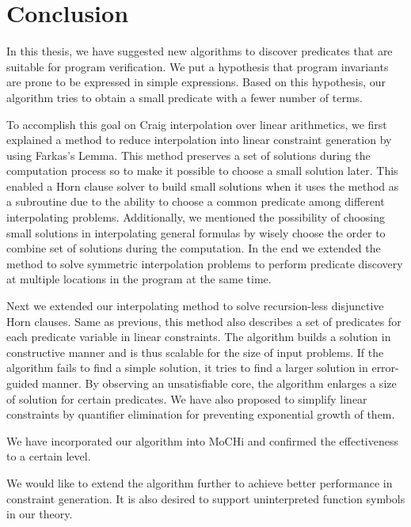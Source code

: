 \chapter{Conclusion}
\label{chap:conclusion}

In this thesis, we have suggested new algorithms to discover
predicates that are suitable for program verification.  We put a
hypothesis that program invariants are prone to be expressed in simple
expressions.  Based on this hypothesis, our algorithm tries to obtain
a small predicate with a fewer number of terms.

To accomplish this goal on Craig interpolation over linear
arithmetics, we first explained a method to reduce interpolation into
linear constraint generation by using Farkas's Lemma.  This method
preserves a set of solutions during the computation process so to make
it possible to choose a small solution later. This enabled a Horn
clause solver to build small solutions when it uses the method as a
subroutine due to the ability to choose a common predicate among
different interpolating problems. Additionally, we mentioned the
possibility of choosing small solutions in interpolating general
formulas by wisely choose the order to combine set of solutions during
the computation. In the end we extended the method to solve symmetric
interpolation problems to perform predicate discovery at multiple
locations in the program at the same time.

Next we extended our interpolating method to solve recursion-less
disjunctive Horn clauses.  Same as previous, this method also
describes a set of predicates for each predicate variable in linear
constraints.  The algorithm builds a solution in constructive manner
and is thus scalable for the size of input problems. If the algorithm
fails to find a simple solution, it tries to find a larger solution in
error-guided manner.  By observing an unsatisfiable core, the
algorithm enlarges a size of solution for certain predicates.  We have
also proposed to simplify linear constraints by quantifier elimination
for preventing exponential growth of them.

We have incorporated our algorithm into MoCHi and confirmed the
effectiveness to a certain level.

We would like to extend the algorithm further to achieve better
performance in constraint generation.  It is also desired to support
uninterpreted function symbols in our theory.
